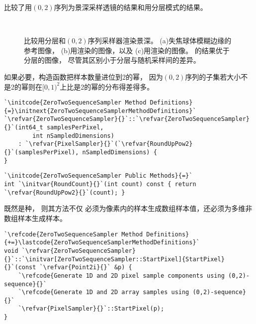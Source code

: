 比较了用$(0,2)$序列为景深采样透镜的结果和用分层模式的结果。
\begin{figure}[htbp]
    \,
    \\
    \caption{比较用分层和$(0,2)$序列采样器渲染景深。
        (a)失焦球体模糊边缘的参考图像，
        (b)用\protect{}渲染的图像，以及
        (c)用渲染的图像。
        的结果优于分层的图像，
        尽管其区别小于分层与随机采样间的差异。}
    \label{fig:7.30}
\end{figure}

如果必要，构造函数把样本数量进位到2的幂，
因为$(0,2)$序列的子集若大小不是2的幂则在$[0,1)^2$上比是2的幂的分布得差得多。
\begin{lstlisting}
`\initcode{ZeroTwoSequenceSampler Method Definitions}{=}\initnext{ZeroTwoSequenceSamplerMethodDefinitions}`
`\refvar{ZeroTwoSequenceSampler}{}`::`\refvar{ZeroTwoSequenceSampler}{}`(int64_t samplesPerPixel,
        int nSampledDimensions)
    : `\refvar{PixelSampler}{}`(`\refvar{RoundUpPow2}{}`(samplesPerPixel), nSampledDimensions) {
}
\end{lstlisting}
\begin{lstlisting}
`\initcode{ZeroTwoSequenceSampler Public Methods}{=}`
int `\initvar{RoundCount}{}`(int count) const { return `\refvar{RoundUpPow2}{}`(count); }
\end{lstlisting}

既然是种，
则其方法{}不仅
必须为像素内的样本生成数组样本值，还必须为多维非数组样本生成样本。
\begin{lstlisting}
`\refcode{ZeroTwoSequenceSampler Method Definitions}{+=}\lastcode{ZeroTwoSequenceSamplerMethodDefinitions}`
void `\refvar{ZeroTwoSequenceSampler}{}`::`\initvar[ZeroTwoSequenceSampler::StartPixel]{StartPixel}{}`(const `\refvar{Point2i}{}` &p) {
    `\refcode{Generate 1D and 2D pixel sample components using (0,2)-sequence}{}`
    `\refcode{Generate 1D and 2D array samples using (0,2)-sequence}{}`
    `\refvar{PixelSampler}{}`::StartPixel(p);
}
\end{lstlisting}

